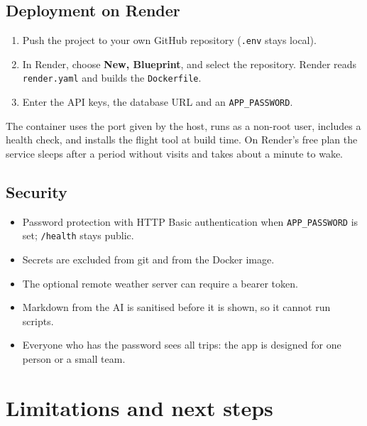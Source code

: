 \documentclass[11pt,a4paper]{article}
\newcommand{\code}[1]{\texttt{\color{slate}#1}}
\begin{document}
\subsection{Deployment on Render}
\begin{enumerate}[leftmargin=1.6em]
  \item Push the project to your own GitHub repository (\code{.env} stays local).
  \item In Render, choose \textbf{New, Blueprint}, and select the repository. Render reads \code{render.yaml} and builds the \code{Dockerfile}.
  \item Enter the API keys, the database URL and an \code{APP\_PASSWORD}.
\end{enumerate}
The container uses the port given by the host, runs as a non-root user, includes a health check, and installs the flight tool at build time. On Render's free plan the service sleeps after a period without visits and takes about a minute to wake.

\subsection{Security}
\begin{itemize}
  \item Password protection with HTTP Basic authentication when \code{APP\_PASSWORD} is set; \code{/health} stays public.
  \item Secrets are excluded from git and from the Docker image.
  \item The optional remote weather server can require a bearer token.
  \item Markdown from the AI is sanitised before it is shown, so it cannot run scripts.
  \item Everyone who has the password sees all trips: the app is designed for one person or a small team.
\end{itemize}

\section{Limitations and next steps}
\end{document}

